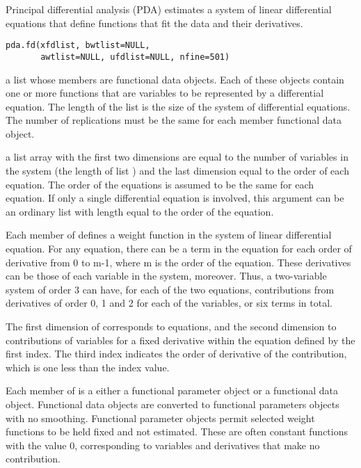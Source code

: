 \begin{Description}\relax
Principal differential analysis (PDA) estimates a
system of linear differential equations that define functions
that fit the data and their derivatives.
\end{Description}
\begin{Usage}
\begin{verbatim}
pda.fd(xfdlist, bwtlist=NULL,
       awtlist=NULL, ufdlist=NULL, nfine=501)
\end{verbatim}
\end{Usage}
\begin{Arguments}
\begin{ldescription}
\item[\code{xfdlist}] a list whose members are functional data objects.  Each of these objects
contain one or more functions that are variables to be represented
by a differential equation.  The length of the list is the size of the
system of differential equations. The number of replications must be
the same for each member functional data object.

\item[\code{bwtlist}] a list array with the first two dimensions are equal to the number of
variables in the system (the length of list ) and
the last dimension equal to the order of each equation.  The order of
the equations is assumed to be the same for each equation.  If only a
single differential equation is involved, this argument can be an
ordinary list with length equal to the order of the equation.

Each member of  defines a weight function
in the system of linear differential equation.  For any equation,
there can be a term in the equation for each order of derivative
from 0 to m-1, where m is the order of the equation.  These derivatives
can be those of each variable in the system, moreover.  Thus, a two-variable
system of order 3 can have, for each of the two equations, contributions
from derivatives of order 0, 1 and 2 for each of the variables, or
six terms in total.

The first dimension of  corresponds to equations,
and the second dimension to contributions of variables for a fixed derivative
within the equation defined by the first index.  The third index indicates
the order of derivative of the contribution, which is one less than the
index value.

Each member of  is a either a functional
parameter object or a functional data object.  Functional data objects
are converted to functional parameters objects with no smoothing.
Functional parameter objects permit selected weight functions to be
held fixed and not estimated.  These are often constant functions with
the value 0, corresponding to variables and derivatives that make no
contribution.


\end{ldescription}
\end{Arguments}
